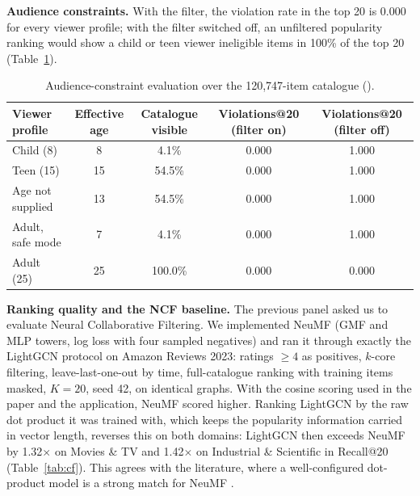 \documentclass[11pt, a4paper]{article}
\begin{document}
\noindent\textbf{Audience constraints.} With the filter, the violation rate in the top 20 is 0.000 for every viewer profile; with the filter switched off, an unfiltered popularity ranking would show a child or teen viewer ineligible items in 100\% of the top 20 (Table~\ref{tab:constraint}).

\begin{table}[H]
    \centering
    \footnotesize
    \renewcommand{\arraystretch}{1.2}
    \begin{tabular}{|l|c|c|c|c|}
        \hline
        \textbf{Viewer profile} & \textbf{Effective age} & \textbf{Catalogue visible} & \textbf{Violations@20 (filter on)} & \textbf{Violations@20 (filter off)} \\
        \hline
        Child (8) & 8 & 4.1\% & 0.000 & 1.000 \\
        Teen (15) & 15 & 54.5\% & 0.000 & 1.000 \\
        Age not supplied & 13 & 54.5\% & 0.000 & 1.000 \\
        Adult, safe mode & 7 & 4.1\% & 0.000 & 1.000 \\
        Adult (25) & 25 & 100.0\% & 0.000 & 0.000 \\
        \hline
    \end{tabular}
    \caption{Audience-constraint evaluation over the 120,747-item catalogue (\protect{}).}
    \label{tab:constraint}
\end{table}

\noindent\textbf{Ranking quality and the NCF baseline.} The previous panel asked us to evaluate Neural Collaborative Filtering. We implemented NeuMF \cite{he2017ncf} (GMF and MLP towers, log loss with four sampled negatives) and ran it through exactly the LightGCN protocol on Amazon Reviews 2023: ratings $\geq 4$ as positives, $k$-core filtering, leave-last-one-out by time, full-catalogue ranking with training items masked, $K=20$, seed 42, on identical graphs. With the cosine scoring used in the paper and the application, NeuMF scored higher. Ranking LightGCN by the raw dot product it was trained with, which keeps the popularity information carried in vector length, reverses this on both domains: LightGCN then exceeds NeuMF by 1.32$\times$ on Movies \& TV and 1.42$\times$ on Industrial \& Scientific in Recall@20 (Table~\ref{tab:cf}). This agrees with the literature, where a well-configured dot-product model is a strong match for NeuMF \cite{rendle2020ncfmf}.
\end{document}
